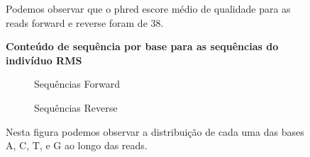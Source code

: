 {\begin{landscape}
\begin{figure}
\begin{subfigure}{.75\textwidth}
\end{subfigure}
\caption[Distribuição do Escore \textit{Phred} em relação a todas as sequências do indivíduo RMS]{Podemos observar que o phred escore médio de qualidade para as reads forward e reverse foram de 38.}
\label{fig:per_sequence_quality}
\end{figure}

\begin{figure}
\centering
\Large\textbf{Conteúdo de sequência por base para as sequências do indivíduo RMS}\par\medskip
\begin{subfigure}{.75\textwidth}
  \centering
  \caption{Sequências Forward}
\end{subfigure}%
\begin{subfigure}{.75\textwidth}
  \centering
  \caption{Sequências Reverse}
\end{subfigure}
\caption[Conteúdo de sequência por base para as sequências do indivíduo RMS]{Nesta figura podemos observar a distribuição de cada uma das bases A, C, T, e G ao longo das reads.}
\label{fig:per_base_sequence_content}
\end{figure}


\end{landscape}}
